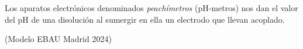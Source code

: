 \documentclass[
  spanish,
]{article}
\begin{document}
Los aparatos electrónicos denominados \emph{peachímetros} (pH-metros)
nos dan el valor del pH de una disolución al sumergir en ella un
electrodo que llevan acoplado.

\begin{exercise}(Modelo EBAU Madrid 2024)

\end{exercise}

\hfill{}

\hfill{}

\hfill{}

\hfill{}
\end{document}
